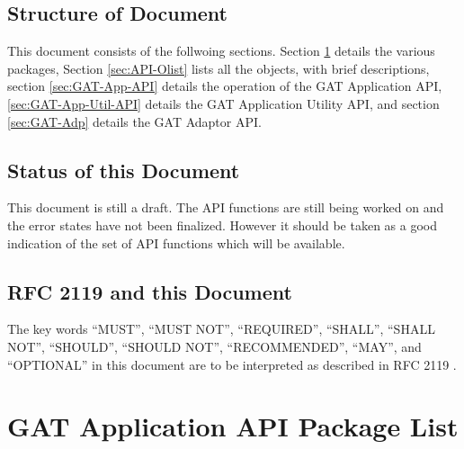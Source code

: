 \documentclass[$Date: 2003/06/26 19:29:31 $]{glabarticle}
\begin{document}
\subsection{Structure of Document}

This document consists of the follwoing sections.  Section \ref{sec:Packages} details the
various packages, Section \ref{sec:API-Olist} lists all the objects, with brief descriptions, 
section \ref{sec:GAT-App-API} details the operation of the GAT Application API, 
\ref{sec:GAT-App-Util-API} details the GAT  Application Utility API, and section 
\ref{sec:GAT-Adp} details the GAT Adaptor API.


\subsection{Status of this Document}

This document is still a draft.  The API functions are still being worked on and the error states 
have not been finalized.  However it should be taken as a good indication of the set of API functions 
which will be available.


\subsection{RFC 2119 and this Document}
The key words ``MUST'', ``MUST NOT'', ``REQUIRED'', ``SHALL'', ``SHALL
NOT'', ``SHOULD'', ``SHOULD NOT'', ``RECOMMENDED'', ``MAY'', and
``OPTIONAL'' in this document are to be interpreted as described in RFC
2119 \cite{RFC2119}.


\newpage

\section{GAT Application API Package List}
\label{sec:Packages}
\end{document}

